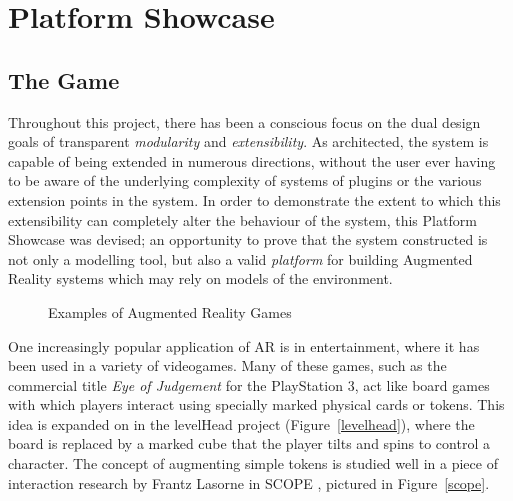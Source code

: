 \documentclass[a4paper,10pt]{article}
\begin{document}
\section{Platform Showcase}
\subsection{The Game}
Throughout this project, there has been a conscious focus on the dual design goals of transparent \textit{modularity} and \textit{extensibility}. As architected, the system is capable of being extended in numerous directions, without the user ever having to be aware of the underlying complexity of systems of plugins or the various extension points in the system. In order to demonstrate the extent to which this extensibility can completely alter the behaviour of the system, this Platform Showcase was devised; an opportunity to prove that the system constructed is not only a modelling tool, but also a valid \textit{platform} for building Augmented Reality systems which may rely on models of the environment.

\begin{figure}[t]
    \quad
    \caption{Examples of Augmented Reality Games}
\end{figure}

One increasingly popular application of AR is in entertainment, where it has been used in a variety of videogames. Many of these games, such as the commercial title \textit{Eye of Judgement} \cite{eyeofjudgement} for the PlayStation 3, act like board games with which players interact using specially marked physical cards or tokens. This idea is expanded on in the levelHead \cite{levelhead} project (Figure~\ref{levelhead}), where the board is replaced by a marked cube that the player tilts and spins to control a character. The concept of augmenting simple tokens is studied well in a piece of interaction research by Frantz Lasorne in SCOPE \cite{scope}, pictured in Figure~\ref{scope}.
\end{document}
